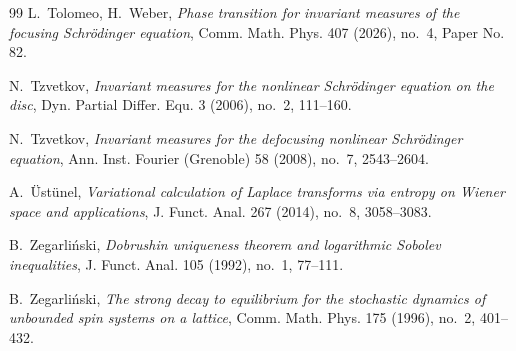 \documentclass[letterpaper, 11pt,  reqno]{amsart}
\theoremstyle{definition}
\newcommand{\1}{\mathbbm 1}
\newcommand{\0}{\mathbf 0}
\numberwithin{equation}{section}
\numberwithin{theorem}{section}
\begin{document}
\begin{thebibliography}{99}
L.~Tolomeo, H.~Weber, 
{\it Phase transition for invariant measures of the focusing Schr\"odinger equation}, 
Comm. Math. Phys. 407 (2026), no.~4, Paper No. 82.
 
N.~Tzvetkov, 
{\it Invariant measures for the nonlinear Schr\"odinger equation on the disc}, 
Dyn. Partial Differ. Equ. 3 (2006), no.~2, 111--160.
 
N.~Tzvetkov, 
{\it Invariant measures for the defocusing nonlinear Schr\"odinger equation}, 
Ann. Inst. Fourier (Grenoble) 58 (2008), no.~7, 2543--2604.
 
A.~\"Ust\"unel,
{\it Variational calculation of Laplace transforms via entropy on Wiener space and applications},
J. Funct. Anal. 267 (2014), no.~8, 3058--3083.
 
 
B.~Zegarli\'nski, 
{\it Dobrushin uniqueness theorem and logarithmic Sobolev inequalities}, J. Funct. Anal. 105 (1992), no.~1, 77--111.
 
 
 
 
B.~Zegarli\'nski, 
{\it The strong decay to equilibrium for the stochastic dynamics of unbounded spin systems on a lattice}, 
Comm. Math. Phys. 175 (1996), no.~2, 401--432.
 
\end{thebibliography}
 
\end{document}
